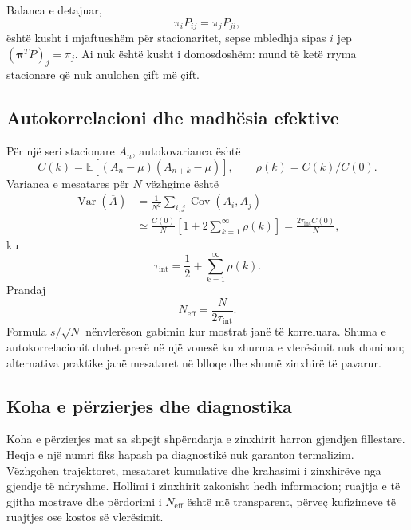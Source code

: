 \documentclass[11pt,oneside,openany]{book}
\newcommand{\vect}[1]{\bm{#1}}
\newcommand{\E}{\mathbb{E}}
\newcommand{\Var}{\operatorname{Var}}
\newcommand{\Cov}{\operatorname{Cov}}
\begin{document}
Balanca e detajuar,
\begin{equation}
 \pi_iP_{ij}=\pi_jP_{ji},
\end{equation}
është kusht i mjaftueshëm për stacionaritet, sepse mbledhja sipas $i$ jep $(\vect\pi^TP)_j=\pi_j$. Ai nuk është kusht i domosdoshëm: mund të ketë rryma stacionare që nuk anulohen çift më çift.

\subsection{Autokorrelacioni dhe madhësia efektive}
Për një seri stacionare $A_n$, autokovarianca është
\begin{equation}
 C(k)=\E[(A_n-\mu)(A_{n+k}-\mu)],
 \qquad \rho(k)=C(k)/C(0).
\end{equation}
Varianca e mesatares për $N$ vëzhgime është
\begin{align}
 \Var(\overline A)&=\frac{1}{N^2}\sum_{i,j}\Cov(A_i,A_j)\\
 &\simeq\frac{C(0)}{N}\left[1+2\sum_{k=1}^{\infty}\rho(k)\right]
 =\frac{2\tau_{\mathrm{int}}C(0)}{N},
\end{align}
ku
\begin{equation}
 \tau_{\mathrm{int}}=\frac12+\sum_{k=1}^{\infty}\rho(k).
\end{equation}
Prandaj
\begin{equation}
 N_{\mathrm{eff}}=\frac{N}{2\tau_{\mathrm{int}}}.
\end{equation}
Formula $s/\sqrt N$ nënvlerëson gabimin kur mostrat janë të korreluara. Shuma e autokorrelacionit duhet prerë në një vonesë ku zhurma e vlerësimit nuk dominon; alternativa praktike janë mesataret në blloqe dhe shumë zinxhirë të pavarur.

\subsection{Koha e përzierjes dhe diagnostika}
Koha e përzierjes mat sa shpejt shpërndarja e zinxhirit harron gjendjen fillestare. Heqja e një numri fiks hapash pa diagnostikë nuk garanton termalizim. Vëzhgohen trajektoret, mesataret kumulative dhe krahasimi i zinxhirëve nga gjendje të ndryshme. Hollimi i zinxhirit zakonisht hedh informacion; ruajtja e të gjitha mostrave dhe përdorimi i $N_{\mathrm{eff}}$ është më transparent, përveç kufizimeve të ruajtjes ose kostos së vlerësimit.
\end{document}
